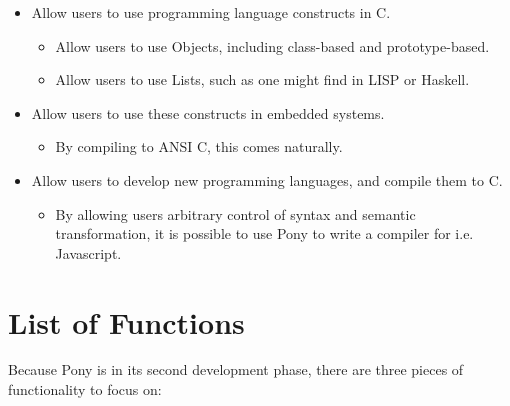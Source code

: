 \documentclass[11pt]{article}
\begin{document}
\begin{itemize}
\item Allow users to use programming language constructs in C.
\begin{itemize}
\item Allow users to use Objects, including class-based and prototype-based.
\item Allow users to use Lists, such as one might find in LISP or Haskell.
\end{itemize}
\item Allow users to use these constructs in embedded systems.
\begin{itemize}
\item By compiling to ANSI C, this comes naturally.
\end{itemize}
\item Allow users to develop new programming languages, and compile them to C.
\begin{itemize}
\item By allowing users arbitrary control of syntax and semantic transformation, it is possible to use Pony to write a compiler for i.e. Javascript.
\end{itemize}
\end{itemize}
\section{List of Functions}
\label{sec-3}

Because Pony is in its second development phase, there are three pieces of functionality to focus on:
\end{document}
